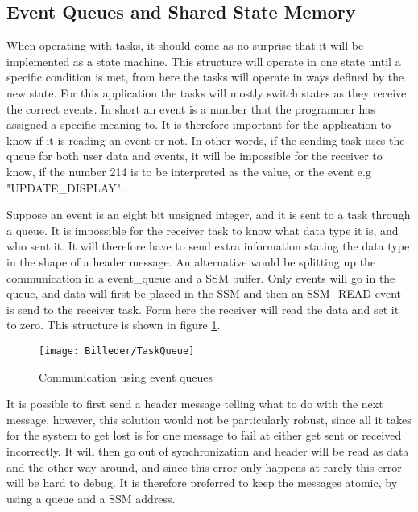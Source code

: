 \subsection{Event Queues and Shared State Memory}
\label{sec:EventQueuesandSharedStateMemory}

When operating with tasks, it should come as no surprise that it will be implemented as a state machine. This structure will operate in one state until a specific condition is met, from here the tasks will operate in ways defined by the new state. For this application the tasks will mostly switch states as they receive the correct events. In short an event is a number that the programmer has assigned a specific meaning to. It is therefore important for the application to know if it is reading an event or not. In other words, if the sending task uses the queue for both user data and events, it will be impossible for the receiver to know, if the number 214 is to be interpreted as the value, or the event e.g "UPDATE\_DISPLAY". 

Suppose an event is an eight bit unsigned integer, and it is sent to a task through a queue. It is impossible for the receiver task to know what data type it is, and who sent it. It will therefore have to send extra information stating the data type in the shape of a header message. 
An alternative would be splitting up the communication in a event\_queue and a SSM buffer. Only events will go in the queue, and data will first be placed in the SSM and then an SSM\_READ event is send to the receiver task. Form here the receiver will read the data and set it to zero. This structure is shown in figure \ref{fig:TaskQueue}.

\begin{figure}[h]
	\centering
	\texttt{[image: Billeder/TaskQueue]}
	\caption{Communication using event queues}
	\label{fig:TaskQueue}
\end{figure}

It is possible to first send a header message telling what to do with the next message, however, this solution would not be particularly robust, since all it takes for the system to get lost is for one message to fail at either get sent or received incorrectly. It will then go out of synchronization and header will be read as data and the other way around, and since this error only happens at rarely this error will be hard to debug. It is therefore preferred to keep the messages atomic, by using a queue and a SSM address. 
 